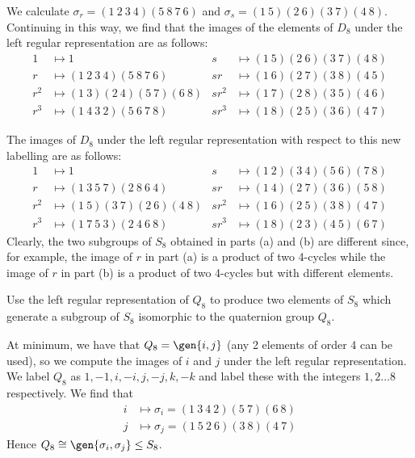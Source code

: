 \begin{solalph}
	\item We calculate $\sigma_r = (1\ 2\ 3\ 4)(5\ 8\ 7\ 6)$ and $\sigma_s = (1\ 5)(2\ 6)(3\ 7)(4\ 8)$. Continuing in this way, we find that the images of the elements of $D_8$ under the left regular representation are as follows:
	\begin{align*}
		1 & \mapsto 1 & s & \mapsto (1\ 5)(2\ 6)(3\ 7)(4\ 8) \\
		r & \mapsto (1\ 2\ 3\ 4)(5\ 8\ 7\ 6) & sr & \mapsto (1\ 6)(2\ 7)(3\ 8)(4\ 5) \\
		r^2 & \mapsto (1\ 3)(2\ 4)(5\ 7)(6\ 8) & sr^2 & \mapsto (1\ 7)(2\ 8)(3\ 5)(4\ 6) \\
		r^3 & \mapsto (1\ 4\ 3\ 2)(5\ 6\ 7\ 8) & sr^3 & \mapsto (1\ 8)(2\ 5)(3\ 6)(4\ 7)
	\end{align*}
	\item The images of $D_8$ under the left regular representation with respect to this new labelling are as follows:
	\begin{align*}
		1 & \mapsto 1 & s & \mapsto (1\ 2)(3\ 4)(5\ 6)(7\ 8) \\
		r & \mapsto (1\ 3\ 5\ 7)(2\ 8\ 6\ 4) & sr & \mapsto (1\ 4)(2\ 7)(3\ 6)(5\ 8) \\
		r^2 & \mapsto (1\ 5)(3\ 7)(2\ 6)(4\ 8) & sr^2 & \mapsto (1\ 6)(2\ 5)(3\ 8)(4\ 7) \\
		r^3 & \mapsto (1\ 7\ 5\ 3)(2\ 4\ 6\ 8) & sr^3 & \mapsto (1\ 8)(2\ 3)(4\ 5)(6\ 7)
	\end{align*}
	Clearly, the two subgroups of $S_8$ obtained in parts (a) and (b) are different since, for example, the image of $r$ in part (a) is a product of two 4-cycles while the image of $r$ in part (b) is a product of two 4-cycles but with different elements.
\end{solalph}

\begin{exercise}
	\label{ex4.2.4} Use the left regular representation of $Q_8$ to produce two elements of $S_8$ which generate a subgroup of $S_8$ isomorphic to the quaternion group $Q_8$.
\end{exercise}

\begin{sol}
	At minimum, we have that $Q_8 = \gen{i, j}$ (any 2 elements of order 4 can be used), so we compute the images of $i$ and $j$ under the left regular representation. We label $Q_8$ as $1, -1, i, -i, j, -j, k, -k$ and label these with the integers $1,2 \ldots 8$ respectively. We find that
	\begin{align*}
		i & \mapsto \sigma_i = (1\ 3\ 4\ 2)(5\ 7)(6\ 8) \\
		j & \mapsto \sigma_j = (1\ 5\ 2\ 6)(3\ 8)(4\ 7)
	\end{align*}
	Hence $Q_8 \cong \gen{\sigma_i, \sigma_j} \leq S_8$.
\end{sol}

